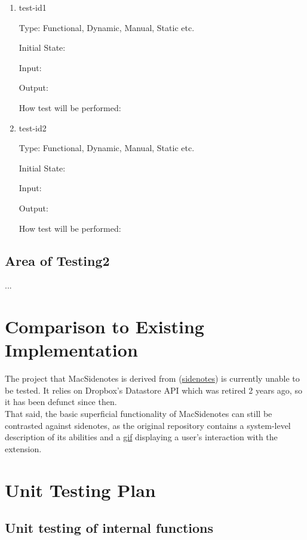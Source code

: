 \documentclass[12pt, titlepage]{article}
\begin{document}
\begin{enumerate}

\item{test-id1\\}

Type: Functional, Dynamic, Manual, Static etc.
					
Initial State: 
					
Input: 
					
Output: 
					
How test will be performed: 
					
\item{test-id2\\}

Type: Functional, Dynamic, Manual, Static etc.
					
Initial State: 
					
Input: 
					
Output: 
					
How test will be performed: 

\end{enumerate}

\subsection{Area of Testing2}

...

	
\section{Comparison to Existing Implementation}	
	The project that MacSidenotes is derived from 
	(\href{https://github.com/sidenotes/sidenotes}{sidenotes}) is currently 
	unable to be tested. It relies on Dropbox's Datastore API which was retired 
	2 years ago, so it has been defunct since then.\\
	That said, the basic superficial functionality of MacSidenotes can still be 
	contrasted against sidenotes, as the original repository contains a 
	system-level description of its abilities and a 
	\href{https://github.com/sidenotes/sidenotes/blob/master/images/Sidenotes-Screenflow.gif}
	{gif} displaying a user's interaction with the extension.
\section{Unit Testing Plan}
		
\subsection{Unit testing of internal functions}
\end{document}
